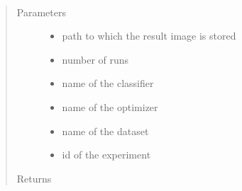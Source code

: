 \documentclass[letterpaper,10pt,english]{sphinxmanual}
\begin{document}

\begin{fulllineitems}
\label{\detokenize{index:plots.plot_hct}}~\begin{quote}\begin{description}
\item[{Parameters}] \leavevmode\begin{itemize}
\item {} 
 \textendash{} path to which the result image is stored

\item {} 
 \textendash{} number of runs

\item {} 
 \textendash{} name of the classifier

\item {} 
 \textendash{} name of the optimizer

\item {} 
 \textendash{} name of the dataset

\item {} 
 \textendash{} id of the experiment

\end{itemize}

\item[{Returns}] \leavevmode


\end{description}\end{quote}

\end{fulllineitems}

\end{document}
